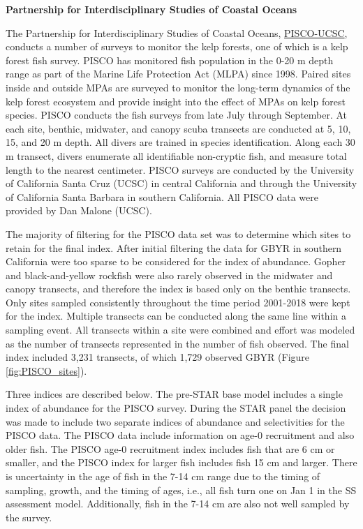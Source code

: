 \documentclass[12pt,]{article}
\begin{document}
\textbf{Partnership for Interdisciplinary Studies of Coastal Oceans}

The Partnership for Interdisciplinary Studies of Coastal Oceans,
\href{http://www.piscoweb.org/kelp-forest-study}{PISCO-UCSC}, conducts a
number of surveys to monitor the kelp forests, one of which is a kelp
forest fish survey. PISCO has monitored fish population in the 0-20 m
depth range as part of the Marine Life Protection Act (MLPA) since 1998.
Paired sites inside and outside MPAs are surveyed to monitor the
long-term dynamics of the kelp forest ecosystem and provide insight into
the effect of MPAs on kelp forest species. PISCO conducts the fish
surveys from late July through September. At each site, benthic,
midwater, and canopy scuba transects are conducted at 5, 10, 15, and 20
m depth. All divers are trained in species identification. Along each 30
m transect, divers enumerate all identifiable non-cryptic fish, and
measure total length to the nearest centimeter. PISCO surveys are
conducted by the University of California Santa Cruz (UCSC) in central
California and through the University of California Santa Barbara in
southern California. All PISCO data were provided by Dan Malone (UCSC).

The majority of filtering for the PISCO data set was to determine which
sites to retain for the final index. After initial filtering the data
for GBYR in southern California were too sparse to be considered for the
index of abundance. Gopher and black-and-yellow rockfish were also
rarely observed in the midwater and canopy transects, and therefore the
index is based only on the benthic transects. Only sites sampled
consistently throughout the time period 2001-2018 were kept for the
index. Multiple transects can be conducted along the same line within a
sampling event. All transects within a site were combined and effort was
modeled as the number of transects represented in the number of fish
observed. The final index included 3,231 transects, of which 1,729
observed GBYR (Figure \ref{fig:PISCO_sites}).

Three indices are described below. The pre-STAR base model includes a
single index of abundance for the PISCO survey. During the STAR panel
the decision was made to include two separate indices of abundance and
selectivities for the PISCO data. The PISCO data include information on
age-0 recruitment and also older fish. The PISCO age-0 recruitment index
includes fish that are 6 cm or smaller, and the PISCO index for larger
fish includes fish 15 cm and larger. There is uncertainty in the age of
fish in the 7-14 cm range due to the timing of sampling, growth, and the
timing of ages, i.e., all fish turn one on Jan 1 in the SS assessment
model. Additionally, fish in the 7-14 cm are also not well sampled by
the survey.
\end{document}
